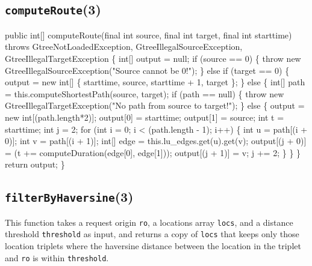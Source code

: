 \subsection{{\tt{}\protect{}computeRoute}(3)}
\nwenddocs{}\endmoddef{}
public int[] computeRoute(final int source, final int target, final int starttime)
throws GtreeNotLoadedException, GtreeIllegalSourceException, GtreeIllegalTargetException \{
  int[] output = null;
  if (source == 0) \{
    throw new GtreeIllegalSourceException("Source cannot be 0!");
  \} else if (target == 0) \{
    output = new int[] \{ starttime, source, starttime + 1, target \};
  \} else \{
    int[] path = this.computeShortestPath(source, target);
    if (path == null) \{
      throw new GtreeIllegalTargetException("No path from source to target!");
    \} else \{
      output = new int[(path.length*2)];
      output[0] = starttime;
      output[1] = source;
      int t = starttime;
      int j = 2;
      for (int i = 0; i < (path.length - 1); i++) \{
        int u = path[(i + 0)];
        int v = path[(i + 1)];
        int[] edge = this.lu_edges.get(u).get(v);
        output[(j + 0)] = (t += computeDuration(edge[0], edge[1]));
        output[(j + 1)] = v;
        j += 2;
      \}
    \}
  \}
  return output;
\}
\eatline
{}\nwendcode{}\nwdocspar
\subsection{{\tt{}\protect{}filterByHaversine}(3)}
This function takes a request origin {\tt{}ro}, a locations array {\tt{}locs}, and
a distance threshold {\tt{}threshold} as input, and returns a copy of {\tt{}locs}
that keeps only those location triplets where the haversine distance between
the location in the triplet and {\tt{}ro} is within {\tt{}threshold}.


